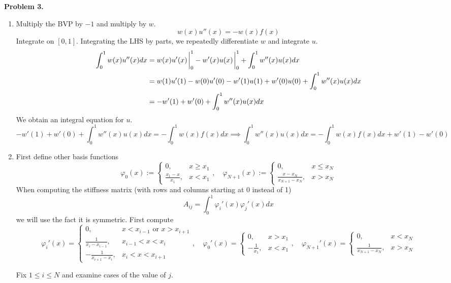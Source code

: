 \documentclass{article}
\def\tbf#1{\textbf{#1}}
\newcommand{\vp}{\varphi}
\newcommand{\imp}{\implies}
\begin{document}
\tbf{Problem 3.}

\begin{enumerate}[label=(\alph*)]
	
\item Multiply the BVP by $-1$ and multiply by $w$.
$$w(x)u''(x) = -w(x)f(x)$$
Integrate on $[0,1]$. Integrating the LHS by parts, we repeatedly differentiate $w$ and integrate $u$.
\begin{align*}
	\int_0^1 w(x)u''(x)dx &= w(x)u'(x)\eval_0^1 - w'(x)u(x)\eval_0^1 + \int_0^1 w''(x)u(x)dx\\
	&= w(1)u'(1) - w(0)u'(0) - w'(1)u(1) + w'(0)u(0) + \int_0^1 w''(x)u(x)dx\\
	&= -w'(1) + w'(0) + \int_0^1 w''(x)u(x)dx
\end{align*}
We obtain an integral equation for $u$.
$$-w'(1) + w'(0) + \int_0^1 w''(x)u(x)dx = -\int_0^1 w(x)f(x)dx
\imp \int_0^1 w''(x)u(x)dx = -\int_0^1 w(x)f(x)dx + w'(1) - w'(0)$$


\item First define other basis functions
$$\vp_0(x) :=
\begin{cases}
	0, & x\ge x_1\\
	\frac{x_1-x}{x_1}, & x<x_1
\end{cases},
\quad \vp_{N+1}(x) :=
\begin{cases}
	0, & x\le x_N\\
	\frac{x-x_N}{x_{N+1}-x_N}, & x>x_N
\end{cases}$$
When computing the stiffness matrix (with rows and columns starting at 0 instead of 1)
$$A_{ij} = \int_0^1\vp_i'(x)\vp_j'(x)dx$$
we will use the fact it is symmetric. First compute
$$\vp_i'(x) =
\begin{cases}
	0, & x<x_{i-1} \text{ or } x>x_{i+1}\\
	\frac{1}{x_i-x_{i-1}}, & x_{i-1}<x<x_i\\
	-\frac{1}{x_{i+1}-x_i}, & x_i<x<x_{i+1}
\end{cases},
\quad \vp_0'(x) =
\begin{cases}
	0, & x>x_1\\
	-\frac{1}{x_1}, & x<x_1
\end{cases},
\quad \vp_{N+1}'(x) =
\begin{cases}
	0, & x<x_N\\
	\frac{1}{x_{N+1}-x_N}, & x>x_N
\end{cases}$$


Fix $1\le i\le N$ and examine cases of the value of $j$.
\begin{itemize}
	

\end{itemize}
\end{enumerate}
\end{document}
